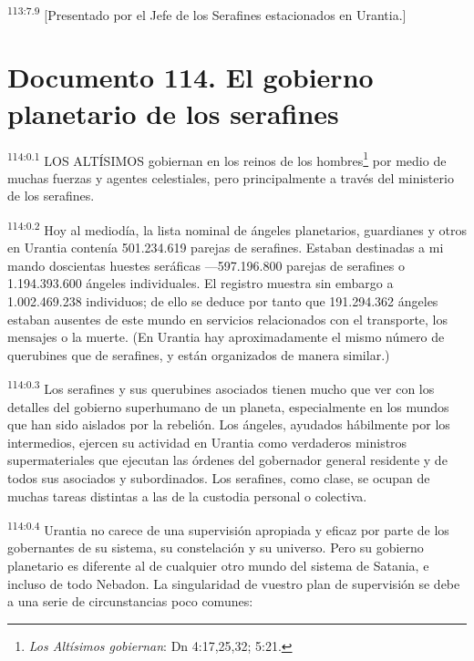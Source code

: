 \documentclass[twoside, 11pt]{book}
\begin{document}
\par
\textsuperscript{113:7.9} [Presentado por el Jefe de los Serafines estacionados en Urantia.]


\chapter{Documento 114. El gobierno planetario de los serafines}
\par
\textsuperscript{114:0.1} LOS ALTÍSIMOS gobiernan en los reinos de los hombres\footnote{\textit{Los Altísimos gobiernan}: Dn 4:17,25,32; 5:21.} por medio de muchas fuerzas y agentes celestiales, pero principalmente a través del ministerio de los serafines.

\par
\textsuperscript{114:0.2} Hoy al mediodía, la lista nominal de ángeles planetarios, guardianes y otros en Urantia contenía 501.234.619 parejas de serafines. Estaban destinadas a mi mando doscientas huestes seráficas ---597.196.800 parejas de serafines o 1.194.393.600 ángeles individuales. El registro muestra sin embargo a 1.002.469.238 individuos; de ello se deduce por tanto que 191.294.362 ángeles estaban ausentes de este mundo en servicios relacionados con el transporte, los mensajes o la muerte. (En Urantia hay aproximadamente el mismo número de querubines que de serafines, y están organizados de manera similar.)

\par
\textsuperscript{114:0.3} Los serafines y sus querubines asociados tienen mucho que ver con los detalles del gobierno superhumano de un planeta, especialmente en los mundos que han sido aislados por la rebelión. Los ángeles, ayudados hábilmente por los intermedios, ejercen su actividad en Urantia como verdaderos ministros supermateriales que ejecutan las órdenes del gobernador general residente y de todos sus asociados y subordinados. Los serafines, como clase, se ocupan de muchas tareas distintas a las de la custodia personal o colectiva.

\par
\textsuperscript{114:0.4} Urantia no carece de una supervisión apropiada y eficaz por parte de los gobernantes de su sistema, su constelación y su universo. Pero su gobierno planetario es diferente al de cualquier otro mundo del sistema de Satania, e incluso de todo Nebadon. La singularidad de vuestro plan de supervisión se debe a una serie de circunstancias poco comunes:
\end{document}
